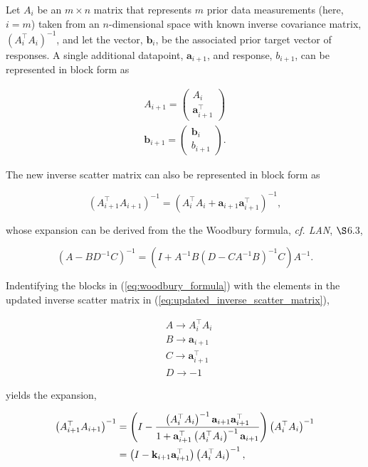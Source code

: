 \documentclass[12pt, twoside, draft]{article}
\begin{document}
Let $A_i$ be an $m \times n$ matrix that represents $m$ prior data measurements (here, $i=m$) taken from an $n$-dimensional space with known inverse covariance matrix, $\left( A_i^\top A_i \right)^{-1}$, and let the vector, $\mathbf{b}_i$, be the associated prior target vector of responses.  A single additional datapoint, $\mathbf{a}_{i+1}$, and response, $b_{i+1}$, can be represented in block form as

\begin{align}
A_{i+1} = \begin{pmatrix} A_i \\ \mathbf{a}_{i+1}^\top \end{pmatrix} \\
\mathbf{b}_{i+1} = \begin{pmatrix} \mathbf{b}_i \\ b_{i+1} \end{pmatrix} .
\end{align}

The new inverse scatter matrix can also be represented in block form as

\begin{equation}\label{eq:updated_inverse_scatter_matrix}
\left( A_{i+1}^\top A_{i+1} \right)^{-1} = \left( A_i^\top A_i + \mathbf{a}_{i+1} \mathbf{a}_{i+1}^\top \right)^{-1},
\end{equation}

whose expansion can be derived from the the Woodbury formula, \textit{cf. LAN}, $\S$6.3, 

\begin{equation}\label{eq:woodbury_formula}
\left( A - BD^{-1}C \right)^{-1} = (I + A^{-1}B \left( D - CA^{-1}B \right)^{-1}C) A^{-1}.
\end{equation}

Indentifying the blocks in (\ref{eq:woodbury_formula}) with the elements in the updated  inverse scatter matrix in (\ref{eq:updated_inverse_scatter_matrix}),

\begin{align}
&A \rightarrow A_i^\top A_i \\
&B \rightarrow \mathbf{a}_{i+1} \\
&C \rightarrow \mathbf{a}_{i+1}^\top \\
&D \rightarrow -1
\end{align}

yields the expansion,

\begin{align}\label{eq:updated_inverse_scatter_matrix}
\left( A_{i+1}^\top A_{i+1} \right)^{-1} &= \left( I - \frac{\left( A_i^\top A_i \right)^{-1} \mathbf{a}_{i+1} \mathbf{a}_{i+1}^\top }{1 + \mathbf{a}_{i+1}^\top \left( A_i^\top A_i \right)^{-1} \mathbf{a}_{i+1}} \right)  \left( A_i^\top A_i \right)^{-1} \notag \\
&= \left( I - \mathbf{k}_{i+1} \mathbf{a}_{i+1}^\top \right) \left( A_i^\top A_i \right)^{-1},
\end{align}
\end{document}
